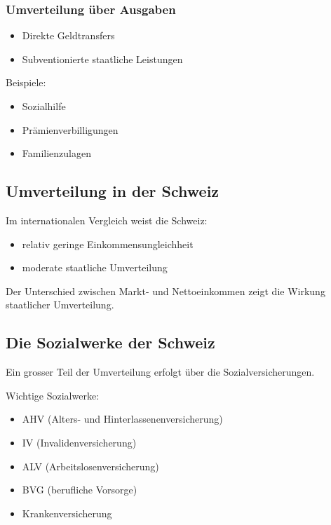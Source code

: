 \subsubsection{Umverteilung über Ausgaben}

\begin{itemize}
\item Direkte Geldtransfers
\item Subventionierte staatliche Leistungen
\end{itemize}

Beispiele:

\begin{itemize}
\item Sozialhilfe
\item Prämienverbilligungen
\item Familienzulagen
\end{itemize}

\subsection{Umverteilung in der Schweiz}

Im internationalen Vergleich weist die Schweiz:

\begin{itemize}
\item relativ geringe Einkommensungleichheit
\item moderate staatliche Umverteilung
\end{itemize}

Der Unterschied zwischen Markt- und Nettoeinkommen zeigt die Wirkung staatlicher Umverteilung.

\subsection{Die Sozialwerke der Schweiz}

Ein grosser Teil der Umverteilung erfolgt über die Sozialversicherungen.

Wichtige Sozialwerke:

\begin{itemize}
\item AHV (Alters- und Hinterlassenenversicherung)
\item IV (Invalidenversicherung)
\item ALV (Arbeitslosenversicherung)
\item BVG (berufliche Vorsorge)
\item Krankenversicherung
\end{itemize}

